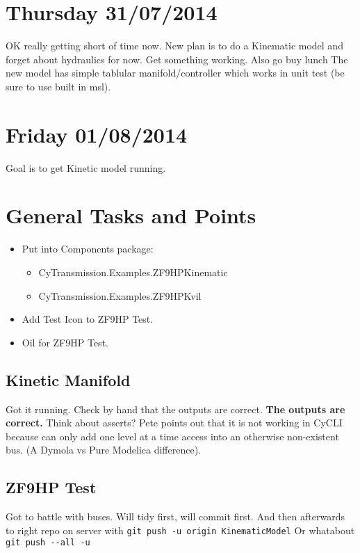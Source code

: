 \documentclass[11pt, oneside]{article}   	%
\begin{document}
\section{Thursday 31/07/2014}
OK really getting short of time now.
New plan is to do a Kinematic model and forget about hydraulics for
now.
Get something working.
Also go buy lunch
The new model has simple tablular manifold/controller which works in
unit test (be sure to use built in msl).

\section{Friday 01/08/2014}
Goal is to get Kinetic model running.

\section{General Tasks and Points}
\label{sec:general-tasks-points}

\begin{itemize}
 \item Put into Components package:
   \begin{itemize}
   \item CyTransmission.Examples.ZF9HPKinematic 
   \item CyTransmission.Examples.ZF9HPKvil 
   \end{itemize} 
\item Add Test Icon to ZF9HP Test. 
\item Oil for  ZF9HP Test. 
\end{itemize}

\subsection{Kinetic Manifold}
\label{sec:kinetic-manifold}
Got it running.  Check by hand that the outputs are correct.  {\bf The
outputs are correct.}
Think about asserts?
Pete points out that it is not working in CyCLI because can only add
one level at a time access into an otherwise non-existent bus.
(A Dymola vs Pure Modelica difference).

\subsection{ZF9HP Test}
\label{sec:zf9hp}
Got to battle with buses.   Will tidy first, will commit first.
And then afterwards to right repo on server with
\verb+git push -u origin KinematicModel+
Or whatabout
\verb+git push --all -u+
\end{document}
